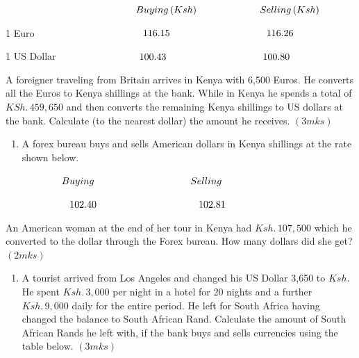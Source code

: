 \documentclass[
  a4paperpaper,
]{scrbook}
\providecommand{\tightlist}{%
  \setlength{\itemsep}{0pt}\setlength{\parskip}{0pt}}\usepackage{longtable,booktabs,array}
\begin{document}
\begin{tcolorbox}
\(\hspace{4.7cm} Buying \,(Ksh)\hspace{2.3cm} Selling \,(Ksh)\)

1 Euro \(\hspace{3.8cm}116.15 \hspace{3.5cm} 116.26\)

1 US Dollar \(\hspace{2.9cm}100.43 \hspace{3.5cm} 100.80\)

A foreigner traveling from Britain arrives in Kenya with 6,500 Euros. He
converts all the Euros to Kenya shillings at the bank. While in Kenya he
spends a total of \(KSh.\, 459,650\) and then converts the remaining
Kenya shillings to US dollars at the bank. Calculate (to the nearest
dollar) the amount he receives. \hspace{10.2cm } \((3mks)\)

\begin{enumerate}
\def\labelenumi{\arabic{enumi}.}
\setcounter{enumi}{2}
\tightlist
\item
  A forex bureau buys and sells American dollars in Kenya shillings at
  the rate shown below.
\end{enumerate}

\(\hspace{2cm} Buying\hspace{3.5cm} Selling\)

\(\hspace{2.3cm} 102.40 \hspace{3.7cm}102.81\)

An American woman at the end of her tour in Kenya had \(Ksh. \,107,500\)
which he converted to the dollar through the Forex bureau. How many
dollars did she get? \hspace{3.3cm}\((2mks)\)

\begin{enumerate}
\def\labelenumi{\arabic{enumi}.}
\setcounter{enumi}{3}
\item
  A tourist arrived from Los Angeles and changed his US Dollar 3,650 to
  \(Ksh.\) He spent \(Ksh. \, 3,000\) per night in a hotel for 20 nights
  and a further \(Ksh. \, 9,000\) daily for the entire period. He left
  for South Africa having changed the balance to South African Rand.
  Calculate the amount of South African Rands he left with, if the bank
  buys and sells currencies using the table below. \hspace{14.3cm}
  \((3mks)\)


\end{enumerate}
\end{tcolorbox}
\end{document}
